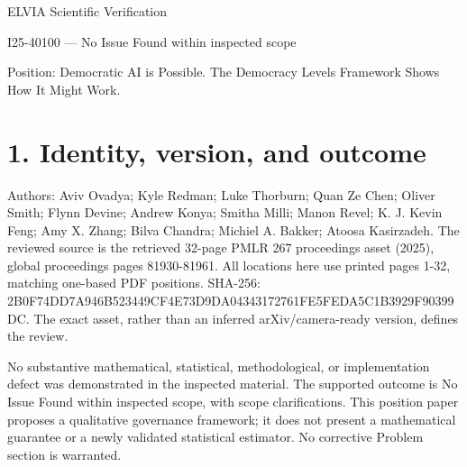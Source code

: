 \documentclass[10pt]{article}
\begin{document}
ELVIA Scientific Verification\par
I25-40100 — No Issue Found within inspected scope\par
Position: Democratic AI is Possible. The Democracy Levels Framework Shows How It Might Work.\par
\section*{1. Identity, version, and outcome}
Authors: Aviv Ovadya; Kyle Redman; Luke Thorburn; Quan Ze Chen; Oliver Smith; Flynn Devine; Andrew Konya; Smitha Milli; Manon Revel; K. J. Kevin Feng; Amy X. Zhang; Bilva Chandra; Michiel A. Bakker; Atoosa Kasirzadeh. The reviewed source is the retrieved 32-page PMLR 267 proceedings asset (2025), global proceedings pages 81930-81961. All locations here use printed pages 1-32, matching one-based PDF positions. SHA-256: 2B0F74DD7A946B523449CF4E73D9DA04343172761FE5FEDA5C1B3929F90399DC. The exact asset, rather than an inferred arXiv/camera-ready version, defines the review.\par
No substantive mathematical, statistical, methodological, or implementation defect was demonstrated in the inspected material. The supported outcome is No Issue Found within inspected scope, with scope clarifications. This position paper proposes a qualitative governance framework; it does not present a mathematical guarantee or a newly validated statistical estimator. No corrective Problem section is warranted.\par
\end{document}
